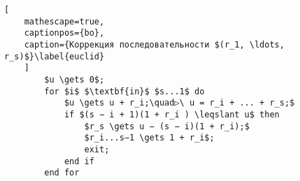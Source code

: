 \documentclass{../../template/mai_book}
\begin{document}


    \setcounter{chapter}{3}


    \setcounter{subsection}{32}


    \newpage
    \chaptertop
    \setcounter{page}{406}

    \setcounter{lstlisting}{7}
    \begin{center}
    \begin{minipage}{0.80\textwidth}
    \begin{lstlisting}[
    mathescape=true,
    captionpos={bo},
    caption={Коррекция последовательности $(r_1, \ldots, r_s)$}\label{euclid}
    ]
    	$u \gets 0$;
    	for $i$ $\textbf{in}$ $s...1$ do
    		$u \gets u + r_i;\quad▷\ u = r_i + ... + r_s;$
    		if $(s − i + 1)(1 + r_i ) \leqslant u$ then
    			$r_s \gets u − (s − i)(1 + r_i);$
    			$r_i...s−1 \gets 1 + r_i$;
    			exit;
    		end if
    	end for
    \end{lstlisting}
    \end{minipage}
    \end{center}

\end{document}
